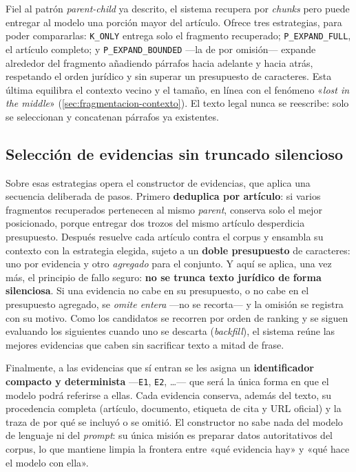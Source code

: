 Fiel al patrón \emph{parent-child} ya descrito, el sistema recupera por \emph{chunks} pero puede entregar al modelo una porción mayor del artículo. Ofrece tres estrategias, para poder compararlas: \texttt{K\_ONLY} entrega solo el fragmento recuperado; \texttt{P\_EXPAND\_FULL}, el artículo completo; y \texttt{P\_EXPAND\_BOUNDED} —la de por omisión— expande alrededor del fragmento añadiendo párrafos hacia adelante y hacia atrás, respetando el orden jurídico y sin superar un presupuesto de caracteres. Esta última equilibra el contexto vecino y el tamaño, en línea con el fenómeno «\emph{lost in the middle}» (\ref{sec:fragmentacion-contexto}). El texto legal nunca se reescribe: solo se seleccionan y concatenan párrafos ya existentes.

\subsection{Selección de evidencias sin truncado silencioso}
\label{subsec:seleccion-evidencias}

Sobre esas estrategias opera el constructor de evidencias, que aplica una secuencia deliberada de pasos. Primero \textbf{deduplica por artículo}: si varios fragmentos recuperados pertenecen al mismo \emph{parent}, conserva solo el mejor posicionado, porque entregar dos trozos del mismo artículo desperdicia presupuesto. Después resuelve cada artículo contra el corpus y ensambla su contexto con la estrategia elegida, sujeto a un \textbf{doble presupuesto} de caracteres: uno por evidencia y otro \emph{agregado} para el conjunto. Y aquí se aplica, una vez más, el principio de fallo seguro: \textbf{no se trunca texto jurídico de forma silenciosa}. Si una evidencia no cabe en su presupuesto, o no cabe en el presupuesto agregado, se \emph{omite entera} —no se recorta— y la omisión se registra con su motivo. Como los candidatos se recorren por orden de ranking y se siguen evaluando los siguientes cuando uno se descarta (\emph{backfill}), el sistema reúne las mejores evidencias que caben sin sacrificar texto a mitad de frase.

Finalmente, a las evidencias que sí entran se les asigna un \textbf{identificador compacto y determinista} —\texttt{E1}, \texttt{E2}, \ldots— que será la única forma en que el modelo podrá referirse a ellas. Cada evidencia conserva, además del texto, su procedencia completa (artículo, documento, etiqueta de cita y URL oficial) y la traza de por qué se incluyó o se omitió. El constructor no sabe nada del modelo de lenguaje ni del \emph{prompt}: su única misión es preparar datos autoritativos del corpus, lo que mantiene limpia la frontera entre «qué evidencia hay» y «qué hace el modelo con ella».

